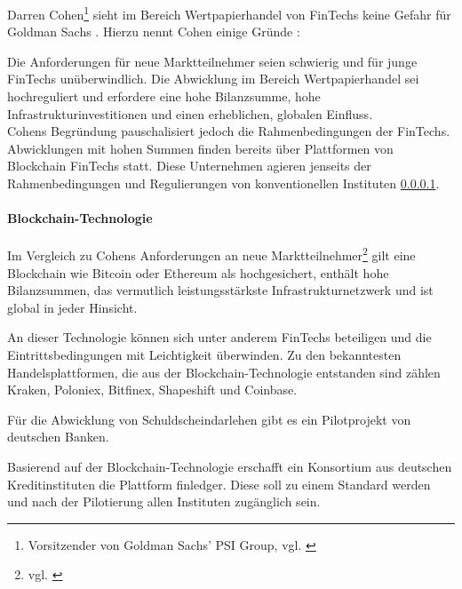 Darren Cohen\footnote{Vorsitzender von Goldman Sachs' PSI Group, vgl. \cite{Gupta:2017}} sieht im Bereich Wertpapierhandel von FinTechs keine Gefahr für Goldman Sachs \cite{Gupta:2017}.
Hierzu nennt Cohen einige Gründe \cite{Gupta:2017}:

Die Anforderungen für neue Marktteilnehmer seien schwierig und für junge FinTechs unüberwindlich. Die Abwicklung im Bereich Wertpapierhandel sei hochreguliert und erfordere eine hohe Bilanzsumme, hohe Infrastrukturinvestitionen und einen erheblichen, globalen Einfluss.
\bigskip
\\
Cohens Begründung pauschalisiert jedoch die Rahmenbedingungen der FinTechs. Abwicklungen mit hohen Summen finden bereits über Plattformen von Blockchain FinTechs statt. Diese Unternehmen agieren jenseits der Rahmenbedingungen und Regulierungen von konventionellen Instituten \ref{Disruption:Blockchain}.

\paragraph{Blockchain-Technologie}
\label{Disruption:Blockchain}
Im Vergleich zu Cohens Anforderungen an neue Marktteilnehmer\footnote{vgl. \cite{Gupta:2017}} gilt eine Blockchain wie Bitcoin oder Ethereum als hochgesichert, enthält hohe Bilanzsummen, das vermutlich leistungsstärkste Infrastrukturnetzwerk und ist global in jeder Hinsicht.

An dieser Technologie können sich unter anderem FinTechs beteiligen und die Eintrittsbedingungen mit Leichtigkeit überwinden. Zu den bekanntesten Handelsplattformen, die aus der Blockchain-Technologie entstanden sind zählen Kraken, Poloniex, Bitfinex, Shapeshift und Coinbase.

Für die Abwicklung von Schuldscheindarlehen gibt es ein Pilotprojekt von deutschen Banken. 

Basierend auf der Blockchain-Technologie erschafft ein Konsortium aus deutschen Kreditinstituten die Plattform finledger. Diese soll zu einem Standard werden und nach der Pilotierung allen Instituten zugänglich sein.

